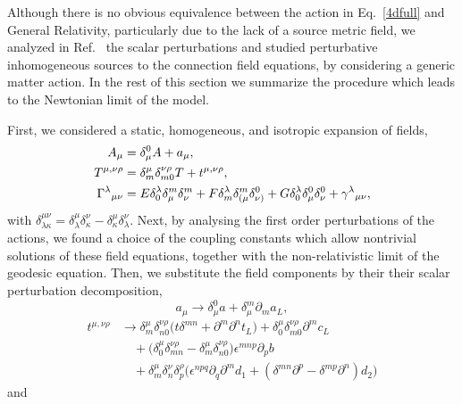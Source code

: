 \documentclass[aps,prd,12pt,twocolumn,superscriptaddress,showpacs,showkeys,reprint%
]{revtex4-1}
\renewcommand{\(}{\left(}
\renewcommand{\)}{\right)}
\renewcommand{\[}{\left[}
\renewcommand{\]}{\right]}
\begin{document}
Although there is no obvious equivalence between the action in Eq.~\eqref{4dfull} and General Relativity, particularly due to the lack of a source metric field, we analyzed in Ref.~\cite{Skirzewski:2014eta} the scalar perturbations and studied perturbative inhomogeneous sources to the connection field equations, by considering a generic matter action. In the rest of this section we summarize the procedure which leads to the Newtonian limit of the model.

First, we considered a static, homogeneous, and isotropic expansion of fields,
\begin{align}
  A_\mu &= \delta_\mu^0 A + a_\mu, \notag \\
  T^{\mu,\nu\rho} &= \delta^{\mu}_m\delta^{\nu\rho}_{m0}T + t^{\mu,\nu\rho},
  \label{GammaExp} \\
  \Gamma^\lambda{}_{\mu\nu} &= E \delta^\lambda_0 \delta^m_\mu \delta^m_\nu + F \delta^\lambda_m \delta^m_{(\mu}\delta^0_{\nu)} + G\delta^\lambda_0 \delta^0_{\mu}\delta^0_{\nu} + \gamma^\lambda{}_{\mu\nu}, \notag
\end{align}
with $\delta^{\mu\nu}_{\lambda\kappa}=\delta^{\mu}_{\lambda}\delta^{\nu}_{\kappa}-\delta^{\mu}_{\kappa}\delta^{\nu}_{\lambda}$. Next, by analysing the first order perturbations of the actions, we found a choice of the coupling constants which allow nontrivial solutions of these field equations, together with the non-relativistic limit of the geodesic equation. Then, we substitute the field components by their their scalar perturbation decomposition,
\begin{equation}
  a_\mu \to \delta_\mu^0 a+\delta_\mu^m \partial_{m}a_L,
\end{equation}
\begin{equation}
  \begin{split}
    t^{\mu,\nu\rho} &\to \delta^{\mu}_m\delta^{\nu\rho}_{n0} \Big(t \delta^{m n} + \partial^m \partial^n t_L \Big)
    +\delta^{\mu}_0 \delta^{\nu\rho}_{m0} \partial^m c_L
    \\
    & \quad + \Big(\delta^{\mu}_0\delta^{\nu\rho}_{mn}-\delta^{\mu}_m\delta^{\nu\rho}_{n0}\Big)\epsilon^{m n p} \partial_{p} b
    \\
    & \quad +\delta^{\mu}_m \delta^{\nu}_{n} \delta^{\rho}_{p} \Big(\epsilon^{n p q}\partial_q \partial^m d_1 +  (\delta^{m n} \partial^p - \delta^{m p} \partial^n)d_2\Big)
  \end{split}
\end{equation}
and
\end{document}
